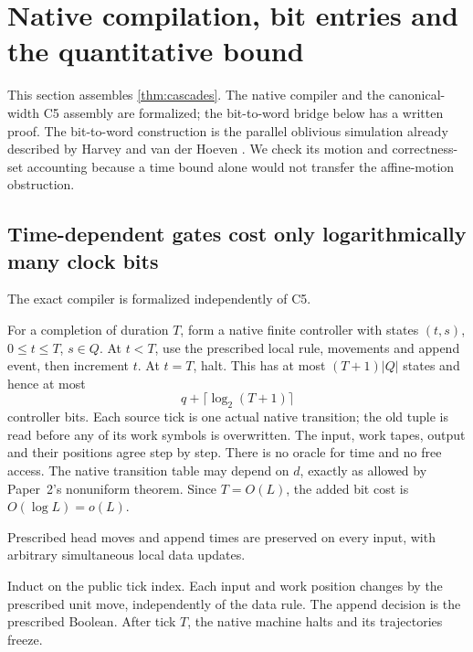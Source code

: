 \section{Native compilation, bit entries and the quantitative bound}
\label{sec:bridges}

This section assembles \cref{thm:cascades}. The native compiler and the
canonical-width C5 assembly are formalized; the bit-to-word bridge below
has a written proof.
The bit-to-word construction is the parallel oblivious simulation already
described by Harvey and van der Hoeven \cite[Section~7.6]{HarveyHoeven2025}.
We check its motion and correctness-set accounting because a time bound
alone would not transfer the affine-motion obstruction.

\subsection{Time-dependent gates cost only logarithmically many clock bits}

The exact compiler is formalized independently of C5.
\begin{outline}
For a completion of duration $T$, form a native finite controller with
states $(t,s)$, $0\le t\le T$, $s\in Q$. At $t<T$, use the prescribed
local rule, movements and append event, then increment $t$. At $t=T$,
halt. This has at most $(T+1)|Q|$ states and hence at most
\[
 q+\lceil\log_2(T+1)\rceil
\]
controller bits. Each source tick is one actual native transition; the
old tuple is read before any of its work symbols is overwritten. The
input, work tapes, output and their positions agree step by step. There
is no oracle for time and no free access. The native transition table
may depend on $d$, exactly as allowed by Paper~2's nonuniform theorem.
Since $T=O(L)$, the added bit cost is $O(\log L)=o(L)$.
\end{outline}
\begin{samepage}
Prescribed head moves and append times are preserved on every input,
with arbitrary simultaneous local data updates.
\end{samepage}
\begin{outline}
Induct on the public tick index. Each input and work position changes by
the prescribed unit move, independently of the data rule. The append
decision is the prescribed Boolean. After tick $T$, the native machine
halts and its trajectories freeze.
\end{outline}

